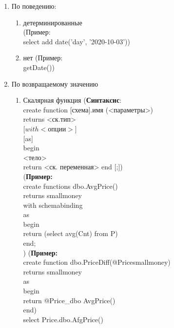 \begin{enumerate}
	\item По поведению:
	      \begin{enumerate}
		      \item детерминированные\\
		            (Пример:\\
		            select add date('day', '2020-10-03'))
		      \item нет (Пример:\\
		            getDate())
	      \end{enumerate}
	\item По возвращаемому значению
	      \begin{enumerate}
		      \item Скалярная функция (\textbf{Синтаксис}:\\
		            create function [схема].имя (<параметры>)\\
		            returns <ск.тип>\\
		            $[with <$опции$>]$\\
		            $[$as$]$\\
		            begin\\
		            <тело>\\
		            return <ск. переменная>
		            end $[$;$]$)\\
		            (\textbf{Пример:}\\
		            create functions dbo.AvgPrice()\\
		            returns smallmoney\\
		            with schemabinding\\
		            as\\
		            begin\\
		            return (select avg(Cnt) from P)\\
		            end;\\)
		            (\textbf{Пример:}\\
		            create function dbo.PriceDiff(@Pricesmallmoney)\\
		            returns smallmoney\\
		            as\\
		            begin\\
		            return @Price\_dbo AvgPrice()\\
		            end)\\
		            select Price.dbo.AfgPrice()\\

\end{enumerate}
\end{enumerate}
